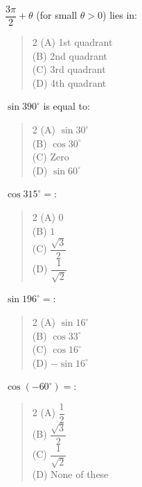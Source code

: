 \documentclass[11pt,a4paper]{article}
\begin{document}
\begin{mcqlist}
\item $\dfrac{3\pi}{2}+\theta$ (for small $\theta>0$) lies in:
\begin{quote}\begin{multicols}{2}
\noindent (A) 1st quadrant \\
(B) 2nd quadrant \\
(C) 3rd quadrant \\
(D) 4th quadrant
\end{multicols}\end{quote}

\item $\sin390^{\circ}$ is equal to:
\begin{quote}\begin{multicols}{2}
\noindent (A) $\sin30^{\circ}$ \\
(B) $\cos30^{\circ}$ \\
(C) Zero \\
(D) $\sin60^{\circ}$
\end{multicols}\end{quote}

\item $\cos315^{\circ} = $:
\begin{quote}\begin{multicols}{2}
\noindent (A) $0$ \\
(B) $1$ \\
(C) $\dfrac{\sqrt{3}}{2}$ \\
(D) $\dfrac{1}{\sqrt{2}}$
\end{multicols}\end{quote}

\item $\sin196^{\circ} = $:
\begin{quote}\begin{multicols}{2}
\noindent (A) $\sin16^{\circ}$ \\
(B) $\cos33^{\circ}$ \\
(C) $\cos16^{\circ}$ \\
(D) $-\sin16^{\circ}$
\end{multicols}\end{quote}

\item $\cos(-60^{\circ}) = $:
\begin{quote}\begin{multicols}{2}
\noindent (A) $\dfrac{1}{2}$ \\
(B) $\dfrac{\sqrt{3}}{2}$ \\
(C) $\dfrac{1}{\sqrt{2}}$ \\
(D) None of these
\end{multicols}\end{quote}


\end{mcqlist}
\end{document}
